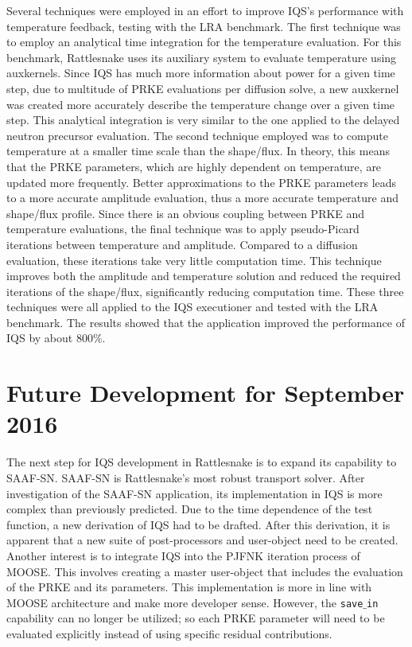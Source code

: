 \documentclass[11pt]{scrartcl}
\begin{document}
Several techniques were employed in an effort to improve IQS's performance with temperature feedback, testing with the LRA benchmark. The first technique was to employ an analytical time integration for the temperature evaluation.  For this benchmark, Rattlesnake uses its auxiliary system to evaluate temperature using auxkernels.  Since IQS has much more information about power for a given time step, due to multitude of PRKE evaluations per diffusion solve, a new auxkernel was created more accurately describe the temperature change over a given time step.  This analytical integration is very similar to the one applied to the delayed neutron precursor evaluation.  The second technique employed was to compute temperature at a smaller time scale than the shape/flux.  In theory, this means that the PRKE parameters, which are highly dependent on temperature, are updated more frequently.  Better approximations to the PRKE parameters leads to a more accurate amplitude evaluation, thus a more accurate temperature and shape/flux profile.  Since there is an obvious coupling between PRKE and temperature evaluations, the final technique was to apply pseudo-Picard iterations between temperature and amplitude.  Compared to a diffusion evaluation, these iterations take very little computation time.  This technique improves both the amplitude and temperature solution and reduced the required iterations of the shape/flux, significantly reducing computation time.  These three techniques were all applied to the IQS executioner and tested with the LRA benchmark.  The results showed that the application improved the performance of IQS by about 800\%.

\section*{\large Future Development for September 2016}

The next step for IQS development in Rattlesnake is to expand its capability to SAAF-SN.  SAAF-SN is Rattlesnake's most robust transport solver. After investigation of the SAAF-SN application, its implementation in IQS is more complex than previously predicted. Due to the time dependence of the test function, a new derivation of IQS had to be drafted.  After this derivation, it is apparent that a new suite of post-processors and user-object need to be created.
\\

Another interest is to integrate IQS into the PJFNK iteration process of MOOSE. This involves creating a master user-object that includes the evaluation of the PRKE and its parameters.  This implementation is more in line with MOOSE architecture and make more developer sense. However, the \texttt{save$\_$in} capability can no longer be utilized; so each PRKE parameter will need to be evaluated explicitly instead of using specific residual contributions.



\end{document}

